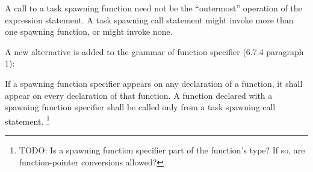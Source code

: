 \begin{note}
A call to a task spawning function need not be
the ``outermost'' operation of the expression statement.
A task spawning call statement
might invoke more than one spawning function,
or might invoke none.
\end{note}

\pnum
A new alternative is added to the grammar of function specifier
(6.7.4 paragraph 1):

\begin{bnf}
\br
{} 
\end{bnf}

\pnum
If a spawning function specifier appears
on any declaration of a function,
it shall appear on every declaration of that function.
A function declared with a spawning function specifier
shall be called only from a task spawning call statement.
\footnote{TODO:
Is a spawning function specifier part of the function's type?
If so, are function-pointer conversions allowed?
}